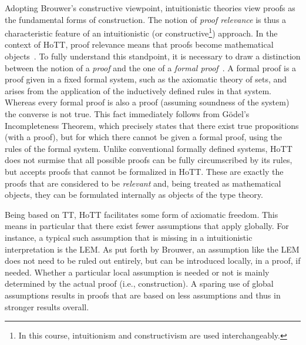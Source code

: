 \documentclass[12pt]{article}
\begin{document}
Adopting Brouwer's constructive viewpoint, intuitionistic theories view proofs as the
fundamental forms of construction.  The notion of \emph{proof relevance} is thus a
characteristic feature of an intuitionistic (or constructive\footnote{In this course,
  intuitionism and constructivism are used interchangeably.}) approach.  In the context of
\ac{HoTT}, proof relevance means that proofs become mathematical objects~\cite{Harper2013}.  To
fully understand this standpoint, it is necessary to draw a distinction between the notion of a
\emph{proof} and the one of a \emph{formal proof}~\cite{Harper2013,Harper2012}.  A formal proof
is a proof given in a fixed formal system, such as the axiomatic theory of sets, and arises
from the application of the inductively defined rules in that system.  Whereas every formal
proof is also a proof (assuming soundness of the system) the converse is not true.  This fact
immediately follows from G\"{o}del's Incompleteness Theorem, which precisely states that there
exist true propositions (with a proof), but for which there cannot be given a formal proof,
using the rules of the formal system.  Unlike conventional formally defined systems, \ac{HoTT}
does not surmise that all possible proofs can be fully circumscribed by its rules, but accepts
proofs that cannot be formalized in \ac{HoTT}.  These are exactly the proofs that are
considered to be \emph{relevant} and, being treated as mathematical objects, they can be
formulated internally as objects of the type theory.

Being based on \acl{TT}, \acs{HoTT} facilitates some form of axiomatic freedom.  This means in
particular that there exist fewer assumptions that apply globally.  For instance, a typical
such assumption that is missing in a intuitionistic interpretation is the \acl{LEM}.  As put
forth by Brouwer, an assumption like the \acl{LEM} does not need to be ruled out entirely, but
can be introduced locally, in a proof, if needed.  Whether a particular local assumption is
needed or not is mainly determined by the actual proof (i.e., construction).  A sparing use of
global assumptions results in proofs that are based on less assumptions and thus in stronger
results overall.
\end{document}

